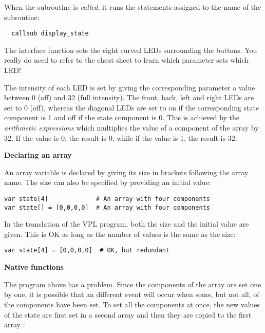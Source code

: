 When the subroutine is \emph{called}, it runs the statements assigned to
the name of the subroutine:
\vspace{-1ex}
\begin{footnotesize}
\begin{verbatim}
  callsub display_state
\end{verbatim}
\end{footnotesize}
\vspace{-1ex}
The interface function  sets the eight curved LEDs
surrounding the buttons. You really do need to refer to the cheat sheet
to learn which parameter sets which LED!

The intensity of each LED is set by giving the corresponding parameter a
value between 0 (off) and 32 (full intensity). The front, back,
left and right LEDs are set to 0 (off), whereas the diagonal LEDs are
set to on if the corresponding state component is 1 and off if the state
component is 0. This is achieved by the \emph{arithmetic expressions}
 which multiplies the value of a component of the array
by 32. If the value is 0, the result is 0, while if the value is 1, the
result is 32.

\textbf{\large Declaring an array}

An array variable is declared by giving its size in brackets following
the array name. The size can also be specified by providing an initial
value:

\begin{footnotesize}
\begin{verbatim}
var state[4]             # An array with four components
var state[] = [0,0,0,0]  # An array with four components
\end{verbatim}
\end{footnotesize}

In the translation of the VPL program, both the size and the initial
value are given. This is OK as long as the number of values is the same
as the size:

\begin{footnotesize}
\begin{verbatim}
var state[4] = [0,0,0,0]  # OK, but redundant
\end{verbatim}
\end{footnotesize}

\textbf{\large Native functions}

The program above has a problem. Since the components of the array
 are set one by one, it is possible that an different event
will occur when some, but not all, of the components have been set. To
set all the components at once, the new values of the state are first
set in a second array  and then they are copied to the
first array :

